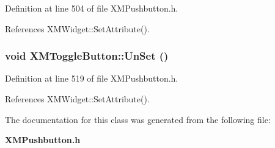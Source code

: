 Definition at line 504 of file XMPushbutton.h.

References XMWidget::Set\-Attribute().
\subsubsection{\setlength{\rightskip}{0pt plus 5cm}void XMToggle\-Button::Un\-Set ()\hspace{0.3cm}{\tt  [inline]}}\label{classXMToggleButton_a10}




Definition at line 519 of file XMPushbutton.h.

References XMWidget::Set\-Attribute().

The documentation for this class was generated from the following file:\begin{CompactItemize}
\item 
{\bf XMPushbutton.h}\end{CompactItemize}
